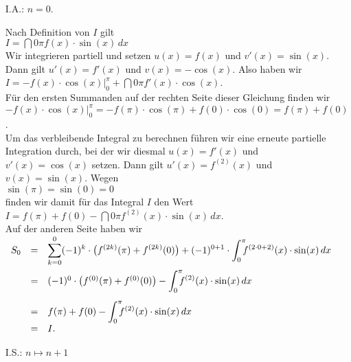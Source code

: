\begin{enumerate}
\item[I.A.:] $n=0$.
     
     Nach Definition von $I$ gilt
     \\[0.2cm]
     \hspace*{1.3cm}
     $I = \dint{0}{\pi} f(x) \cdot \sin(x)\, dx$
     \\[0.2cm]
     Wir integrieren partiell und setzen $u(x) = f(x)$ und $v'(x) = \sin(x)$.
     Dann gilt $u'(x) = f'(x)$ und $v(x) = -\cos(x)$.  Also haben wir
     \\[0.2cm]
     \hspace*{1.3cm}
     $I = - f(x) \cdot \cos(x) \Bigr|_0^\pi + \dint{0}{\pi} f'(x) \cdot \cos(x)$.
     \\[0.2cm]
     F\"ur den ersten Summanden auf der rechten Seite dieser Gleichung finden wir
     \\[0.2cm]
     \hspace*{1.3cm}
     $  - f(x) \cdot \cos(x) \Bigr|_0^\pi = - f(\pi) \cdot \cos(\pi) + f(0) \cdot \cos(0)
      = f(\pi) + f(0)$.
     \\[0.2cm]
     Um das verbleibende Integral zu berechnen f\"uhren wir eine erneute partielle Integration durch, bei
     der wir diesmal $u(x) = f'(x)$ und $v'(x) = \cos(x)$ setzen.  Dann gilt $u'(x) = f^{(2)}(x)$ und
     $v(x) = \sin(x)$.  Wegen 
     \\[0.2cm]
     \hspace*{1.3cm}
     $\sin(\pi) = \sin(0) = 0$
     \\[0.2cm]
     finden wir damit f\"ur das Integral $I$ den Wert
     \\[0.2cm]
     \hspace*{1.3cm}
     $I = f(\pi) + f(0) - \dint{0}{\pi} f^{(2)}(x) \cdot \sin(x)\, dx$.
     \\[0.2cm]
     Auf der anderen Seite haben wir
     \\[0.2cm]
     \hspace*{1.3cm}
     $
     \begin{array}[t]{lcl}
       S_0 & = & \ds \sum\limits_{k=0}^0 (-1)^k \cdot \bigl(f^{(2k)}(\pi) + f^{(2k)}(0)\bigr) + 
                  (-1)^{0+1} \cdot \dint{0}{\pi} f^{(2\cdot 0+2)}(x) \cdot \sin(x)\, dx           \\[0.5cm]
           & = & (-1)^0 \cdot \bigl(f^{(0)}(\pi) + f^{(0)}(0)\bigr)  
                  - \dint{0}{\pi} f^{(2)}(x) \cdot \sin(x)\, dx           \\[0.5cm]
           & = & f(\pi) + f(0) - \dint{0}{\pi} f^{(2)}(x) \cdot \sin(x)\, dx           \\[0.2cm]
           & = & I.
     \end{array}
     $
\item[I.S.:] $n \mapsto n + 1$
     

\end{enumerate}
